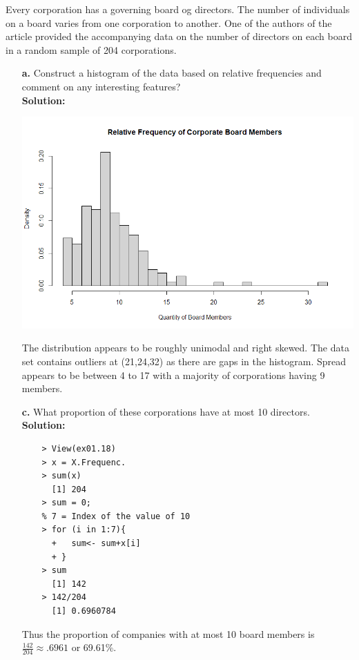 \documentclass[12pt]{article}
\makeatletter
\theoremstyle{homework}
\newenvironment{exercise}[1]
{\def\@currentlabel{#1}\exercisecore}
{\endexercisecore}
\makeatother
\begin{document}
\begin{exercise}{1.18} Every corporation has a governing board og directors. The number of individuals on a board varies from one corporation to another. One of the authors of the article provided the accompanying data on the number of directors on each board in a random sample of 204 corporations.\\
  \begin{enumerate}
    \item[\textbf{a.}] Construct a histogram of the data based on relative frequencies and comment on any interesting features?\\
    
    \textbf{Solution:}
    \begin{center}
\includegraphics[width=\textwidth]{hist.png}      
    \end{center}
    The distribution appears to be roughly unimodal and right skewed. The data set contains outliers at (21,24,32) as there are gaps in the histogram. Spread appears to be between 4 to 17 with a majority of corporations having 9 members.

    \vspace{.5in}
     
    \item[\textbf{c.}] What proportion of these corporations have at most 10 directors.\\
    
    \textbf{Solution:}

    \begin{lstlisting}
    > View(ex01.18)
    > x = X.Frequenc.
    > sum(x)
      [1] 204
    > sum = 0;
    % 7 = Index of the value of 10
    > for (i in 1:7){
      +   sum<- sum+x[i]
      + }
    > sum
      [1] 142
    > 142/204
      [1] 0.6960784
    \end{lstlisting}
    Thus the proportion of companies with at most 10 board members is $\frac{142}{204} \approx .6961$ or 69.61\%. 
    
    \vspace{.5in}
     
  \end{enumerate}


\end{exercise}
\vspace{1in}
\end{document}
